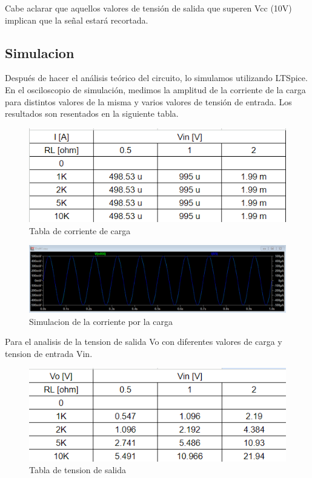 Cabe aclarar que aquellos valores de tensión de salida que superen Vcc (10V) implican que la señal estará recortada.


\subsection{Simulacion}
Después de hacer el análisis teórico del circuito, lo simulamos utilizando LTSpice. En el osciloscopio de simulación, medimos la amplitud de la corriente de la carga para distintos valores de la misma y varios valores de tensión de entrada. Los resultados son resentados en la siguiente tabla.

\begin{figure}[h!]
    \centering
    \includegraphics[width=0.70\linewidth]{Secciones/Circuito2/tabla1.png}
    \caption{Tabla de corriente de carga}
    \label{fig:enter-label}
\end{figure}

\begin{figure}[h!]
    \centering
    \includegraphics[width=0.70\linewidth]{Secciones/Circuito2/simulacion.png}
    \caption{Simulacion de la corriente por la carga}
    \label{fig:enter-label}
\end{figure}

Para el analisis de la tension de salida Vo con diferentes valores de carga y tension de entrada Vin. 

\begin{figure}[h!]
    \centering
    \includegraphics[width=0.70\linewidth]{Secciones/Circuito2/tabla2.png}
    \caption{Tabla de tension de salida}
    \label{fig:enter-label}
\end{figure}


